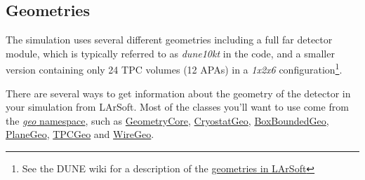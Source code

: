 \documentclass[8pt]{refart}
\begin{document}
\subsection{Geometries}
The simulation uses several different geometries including a full far detector module, which is typically referred to as \textit{dune10kt} in the code, and a smaller version containing only 24 TPC volumes (12 APAs) in a \textit{1x2x6} configuration\footnote{See the DUNE wiki for a description of the \href{https://cdcvs.fnal.gov/redmine/projects/dunetpc/wiki/DUNE_Geometries}{geometries in LArSoft}}.


There are several ways to get information about the geometry of the detector in your simulation from LArSoft.  Most of the classes you'll want to use come from the \href{https://internal.dunescience.org/doxygen/namespacegeo.html}{\textit{geo} namespace}, such as \href{https://internal.dunescience.org/doxygen/classgeo_1_1GeometryCore.html}{GeometryCore}, \href{https://internal.dunescience.org/doxygen/classgeo_1_1CryostatGeo.html}{CryostatGeo}, \href{https://internal.dunescience.org/doxygen/classgeo_1_1BoxBoundedGeo.html}{BoxBoundedGeo}, \href{https://internal.dunescience.org/doxygen/classgeo_1_1PlaneGeo.html}{PlaneGeo}, \href{https://internal.dunescience.org/doxygen/classgeo_1_1TPCGeo.html}{TPCGeo} and \href{https://internal.dunescience.org/doxygen/classgeo_1_1WireGeo.html}{WireGeo}.

\end{document}
